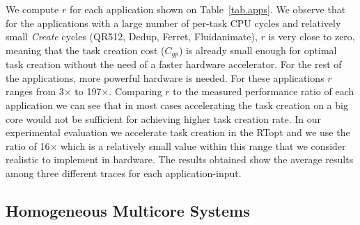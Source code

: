 We compute $r$ for each application shown on Table~\ref{tab.apps}. We observe that for the applications with a large number of per-task CPU cycles and relatively small \textit{Create} cycles (QR512, Dedup, Ferret, Fluidanimate), $r$ is very close to zero, meaning that the task creation cost ($C_{gp}$) is already small enough for optimal task creation without the need of a faster hardware accelerator.
For the rest of the applications, more powerful hardware is needed.
For these applications $r$ ranges from 3$\times$ to 197$\times$.
Comparing $r$ to the measured performance ratio of each application we can see that in most cases accelerating the task creation on a big core would not be sufficient for achieving higher task creation rate.
In our experimental evaluation we accelerate task creation in the RTopt and we use the ratio of 16$\times$ which is a relatively small value within this range that we consider realistic to implement in hardware.
The results obtained show the average results among three different traces for each application-input.

\subsection{Homogeneous Multicore Systems}

